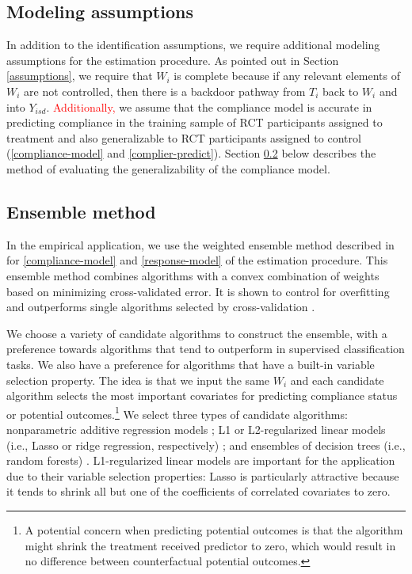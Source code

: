 \documentclass[hidelinks,12pt]{article}
\begin{document}
\subsection{Modeling assumptions}  \label{modeling-assumptions}

In addition to the identification assumptions, we require additional modeling assumptions for the estimation procedure. As pointed out in Section \ref{assumptions}, we require that $W_i$ is complete because if any relevant elements of $W_i$ are not controlled, then there is a backdoor pathway from $T_i$ back to $W_i$ and into $Y_{isd}$. \textcolor{red}{Additionally,} we assume that the compliance model is accurate in predicting compliance in the training sample of RCT participants assigned to treatment and also generalizable to RCT participants assigned to control (\ref{compliance-model} and \ref{complier-predict}). Section \ref{ensemble} below describes the method of evaluating the generalizability of the compliance model.

\subsection{Ensemble method}  \label{ensemble}

In the empirical application, we use the weighted ensemble method described in \citet{van2007} for \ref{compliance-model} and \ref{response-model} of the estimation procedure. This ensemble method combines algorithms with a convex combination of weights based on minimizing cross-validated error. It is shown to control for overfitting and outperforms single algorithms selected by cross-validation \citep{polley2010super}. 

We choose a variety of candidate algorithms to construct the ensemble, with a preference towards algorithms that tend to outperform in supervised classification tasks. We also have a preference for algorithms that have a built-in variable selection property. The idea is that we input the same $W_i$ and each candidate algorithm selects the most important covariates for predicting compliance status or potential outcomes.\footnote{A potential concern when predicting potential outcomes is that the algorithm might shrink the treatment received predictor to zero, which would result in no difference between counterfactual potential outcomes.} We select three types of candidate algorithms: nonparametric additive regression models \citep{buja1989linear}; L1 or L2-regularized linear models (i.e., Lasso or ridge regression, respectively) \citep{tibshirani2012strong}; and ensembles of decision trees (i.e., random forests) \citep{breiman2001}. L1-regularized linear models are important for the application due to their variable selection properties: Lasso is particularly attractive because it tends to shrink all but one of the coefficients of correlated covariates to zero. 
\end{document}
